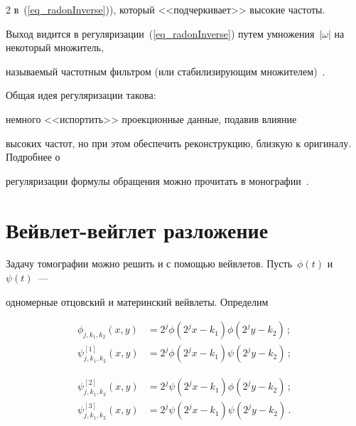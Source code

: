 \begin{multicols}{2}
в~(\ref{eq_radonInverse})), который <<подчеркивает>> высокие частоты.





Выход видится в регуляризации~(\ref{eq_radonInverse}) путем умножения~$|\omega|$ на некоторый множитель, 


называемый частотным фильтром (или стабилизирующим множителем)~\cite{TikhonovArsenin}. 


Общая идея регуляризации такова:\linebreak


немного <<испортить>> проекционные данные, подавив влияние 


высоких частот, но при этом обеспечить реконструкцию, близкую к оригиналу. Подроб\-нее о 


регуляризации формулы обращения можно прочитать в монографии~\cite{Herman}.





\section{Вейвлет-вейглет разложение}





Задачу томографии можно решить и с помощью вейвлетов. Пусть~$\phi(t)$ и~$\psi(t)$~--- 


одномерные отцовский и материнский вейвлеты. Определим


\begin{align*}


\phi_{j,k_1,k_2}(x,y) &= 2^{j} \phi\left(2^jx-k_1\right) \phi\left(2^jy-k_2\right)\,;\\


\psi^{[1]}_{j,k_1,k_2}(x,y) &= 2^{j} \phi\left(2^jx-k_1\right) \psi\left(2^jy-k_2\right)\,;


\end{align*}





\noindent


\begin{align*}


\psi^{[2]}_{j,k_1,k_2}(x,y) &= 2^{j} \psi\left(2^jx-k_1\right) \phi\left(2^jy-k_2\right)\,;\\


\psi^{[3]}_{j,k_1,k_2}(x,y) &= 2^{j} \psi\left(2^jx-k_1\right) \psi\left(2^jy-k_2\right)\,.



\end{align*}
\end{multicols}

